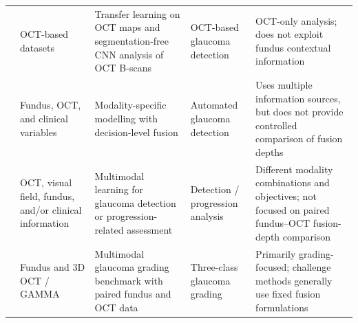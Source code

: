 \documentclass{ieeeaccess}
\begin{document}
\begin{table}[!t]
{\begin{tabular}{p{} p{} p{} p{} p{}}
            \cite{asaoka2019using,thompson2020assessment}                                               &
            OCT-based datasets                                                                          &
            Transfer learning on OCT maps and segmentation-free CNN analysis of OCT B-scans             &
            OCT-based glaucoma detection                                                                &
            OCT-only analysis; does not exploit fundus contextual information                                                                   \\

            \cite{mehta2021automated}                                                                   &
            Fundus, OCT, and clinical variables                                                         &
            Modality-specific modelling with decision-level fusion                                      &
            Automated glaucoma detection                                                                &
            Uses multiple information sources, but does not provide controlled comparison of fusion depths                                      \\

            \cite{luo2023harvard,hwang2025utilization,lim2022use}                                       &
            OCT, visual field, fundus, and/or clinical information                                      &
            Multimodal learning for glaucoma detection or progression-related assessment                &
            Detection / progression analysis                                                            &
            Different modality combinations and objectives; not focused on paired fundus--OCT fusion-depth comparison                           \\

            \cite{wu2023gamma}                                                                          &
            Fundus and 3D OCT / GAMMA                                                                   &
            Multimodal glaucoma grading benchmark with paired fundus and OCT data                       &
            Three-class glaucoma grading                                                                &
            Primarily grading-focused; challenge methods generally use fixed fusion formulations                                                \\


\end{tabular}}
\end{table}
\end{document}
